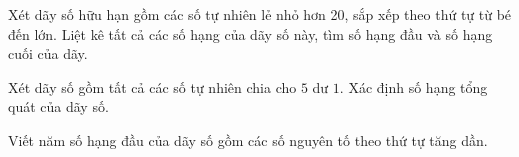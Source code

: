 \begin{bt}[NB]%
	Xét dãy số hữu hạn gồm các số tự nhiên lẻ nhỏ hơn 20, sắp xếp theo thứ tự từ bé đến lớn. Liệt kê tất cả các số hạng của dãy số này, tìm số hạng đầu và số hạng cuối của dãy. 
\end{bt}
\begin{bt}[TH]%
	Xét dãy số gồm tất cả các số tự nhiên chia cho $5$ dư $1$. Xác định số hạng tổng quát của dãy số.
\end{bt}
\begin{bt}[NB]%
	Viết năm số hạng đầu của dãy số gồm các số nguyên tố theo thứ tự tăng dần.
\end{bt}

